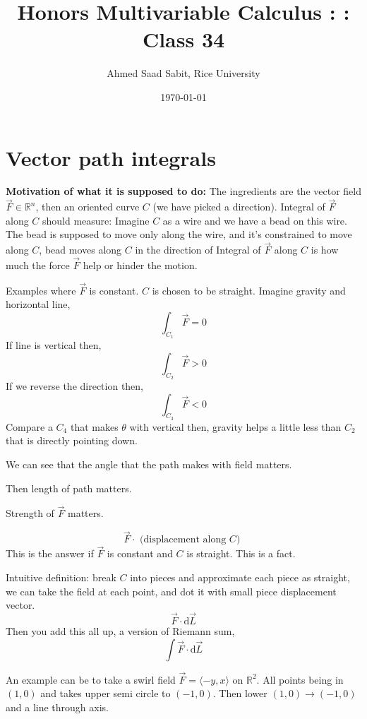 \documentclass[letter]{article}
\title{Honors Multivariable Calculus : : Class 34}
\author{Ahmed Saad Sabit, Rice University}
\date{\today}
\begin{document}
\maketitle
\section*{Vector path integrals}
\textbf{Motivation of what it is supposed to do:} The ingredients are the vector field $\vec{F} \in \mathbb{R}^{n}$, then an oriented curve $C$ (we have picked a direction). Integral of $\vec{F}$ along $C$ should measure: Imagine $C$ as a wire and we have a bead on this wire. The bead is supposed to move only along the wire, and it's constrained to move along $C$, bead moves along $C$ in the direction of Integral of $\vec{F}$ along $C$ is how much the force $\vec{F}$ help or hinder the motion. 

Examples where $\vec{F}$ is constant. $C$ is chosen to be straight. Imagine gravity and horizontal line, 
 \[
	 \int_{C_1} \vec{F} = 0
\]
If line is vertical then, 
\[
	\int_{C_2} \vec{F} > 0
\]
If we reverse the direction then, 
\[
\int_{C_3}^{}  \vec{F} < 0
\]
Compare a $C_4$ that makes $\theta$ with vertical then, gravity helps a little less than $C_2$ that is directly pointing down. 

We can see that the angle that the path makes with field matters. 

Then length of path matters. 

Strength of $\vec{F}$ matters. 

\[
\vec{F} \cdot \text{ (displacement along $C$) }
\]
This is the answer if $\vec{F}$ is constant and $C$ is straight. This is a fact. 

Intuitive definition: break $C$ into pieces and approximate each piece as straight, we can take the field at each point, and dot it with small piece displacement vector. 
\[
\vec{F} \cdot  \mathrm{d} \vec{L}
\]
Then you add this all up, a version of Riemann sum, 
\[
	\int \vec{F} \cdot  \mathrm{d} \vec{L}
\]

An example can be to take a swirl field $\vec{F} = \langle -y , x \rangle$ on $\mathbb{R}^{2}$. All points being in $(1,0) $ and takes upper semi circle to $ (-1,0)$. Then lower $(1,0)\to (-1,0)$ and a line through axis. 
\end{document}
